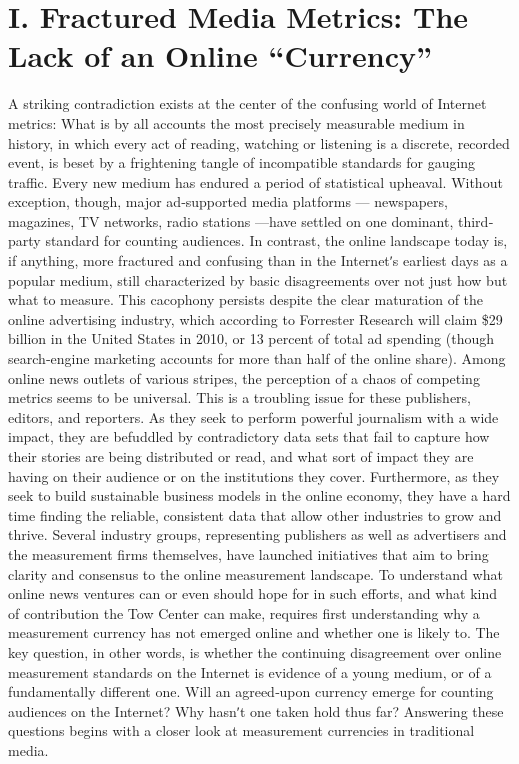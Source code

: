 \chapter{I. Fractured Media Metrics: The Lack of an Online ``Currency''}
A striking contradiction exists at the center of the confusing world of
Internet metrics: What is by all accounts the most precisely measurable
medium in history, in which every act of reading, watching or listening is
a discrete, recorded event, is beset by a frightening tangle of incompatible
standards for gauging traffic.
Every new medium has endured a period of statistical upheaval. Without
exception, though, major ad‐supported media platforms — newspapers,
magazines, TV networks, radio stations —have settled on one dominant,
third‐party standard for counting audiences. In contrast, the online
landscape today is, if anything, more fractured and confusing than in the
Internetʹs earliest days as a popular medium, still characterized by basic
disagreements over not just how but what to measure. This cacophony
persists despite the clear maturation of the online advertising industry,
which according to Forrester Research will claim \$29 billion in the United
States in 2010, or 13 percent of total ad spending (though search‐engine
marketing accounts for more than half of the online share).
Among online news outlets of various stripes, the perception of a chaos of
competing metrics seems to be universal. This is a troubling issue for these
publishers, editors, and reporters. As they seek to perform powerful
journalism with a wide impact, they are befuddled by contradictory data
sets that fail to capture how their stories are being distributed or read, and
what sort of impact they are having on their audience or on the
institutions they cover. Furthermore, as they seek to build sustainable
business models in the online economy, they have a hard time finding the
reliable, consistent data that allow other industries to grow and thrive.
Several industry groups, representing publishers as well as advertisers
and the measurement firms themselves, have launched initiatives that aim
to bring clarity and consensus to the online measurement landscape. To
understand what online news ventures can or even should hope for in
such efforts, and what kind of contribution the Tow Center can make,
requires first understanding why a measurement currency has not
emerged online and whether one is likely to.
The key question, in other words, is whether the continuing disagreement
over online measurement standards on the Internet is evidence of a young
medium, or of a fundamentally different one. Will an agreed‐upon
currency emerge for counting audiences on the Internet? Why hasnʹt one
taken hold thus far? Answering these questions begins with a closer look
at measurement currencies in traditional media.
